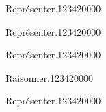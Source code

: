 \begin{pageParcoursu} 

\begin{ExoCu}{Représenter.}{1234}{2}{0}{0}{0}{0}


\end{ExoCu}
\begin{ExoCu}{Représenter.}{1234}{2}{0}{0}{0}{0}


\end{ExoCu}
\begin{ExoCu}{Représenter.}{1234}{2}{0}{0}{0}{0}

\end{ExoCu}


\begin{ExoCu}{Raisonner.}{1234}{2}{0}{0}{0}{0}

\end{ExoCu}

\begin{ExoCu}{Représenter.}{1234}{2}{0}{0}{0}{0}


\end{ExoCu}


\end{pageParcoursu}

  



